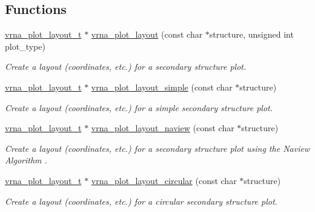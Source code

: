 \subsection*{Functions}
\begin{DoxyCompactItemize}
\item 
\mbox{\hyperlink{group__plot__layout__utils_gac986fe092abc2a6a93ceb5141e4dd28b}{vrna\+\_\+plot\+\_\+layout\+\_\+t}} $\ast$ \mbox{\hyperlink{group__plot__layout__utils_ga7953b759eada86c61b0a4aebe0dc67d1}{vrna\+\_\+plot\+\_\+layout}} (const char $\ast$structure, unsigned int plot\+\_\+type)
\begin{DoxyCompactList}\small\item\em Create a layout (coordinates, etc.) for a secondary structure plot. \end{DoxyCompactList}\item 
\mbox{\hyperlink{group__plot__layout__utils_gac986fe092abc2a6a93ceb5141e4dd28b}{vrna\+\_\+plot\+\_\+layout\+\_\+t}} $\ast$ \mbox{\hyperlink{group__plot__layout__utils_ga8b09019a429c7c2447be94901c7ed658}{vrna\+\_\+plot\+\_\+layout\+\_\+simple}} (const char $\ast$structure)
\begin{DoxyCompactList}\small\item\em Create a layout (coordinates, etc.) for a {\itshape simple} secondary structure plot. \end{DoxyCompactList}\item 
\mbox{\hyperlink{group__plot__layout__utils_gac986fe092abc2a6a93ceb5141e4dd28b}{vrna\+\_\+plot\+\_\+layout\+\_\+t}} $\ast$ \mbox{\hyperlink{group__plot__layout__utils_gab0e886afe200db9323e4e65d44738177}{vrna\+\_\+plot\+\_\+layout\+\_\+naview}} (const char $\ast$structure)
\begin{DoxyCompactList}\small\item\em Create a layout (coordinates, etc.) for a secondary structure plot using the {\itshape Naview Algorithm} \cite{bruccoleri:1988}. \end{DoxyCompactList}\item 
\mbox{\hyperlink{group__plot__layout__utils_gac986fe092abc2a6a93ceb5141e4dd28b}{vrna\+\_\+plot\+\_\+layout\+\_\+t}} $\ast$ \mbox{\hyperlink{group__plot__layout__utils_ga41d94adbd42e1a570d840756e6dd6909}{vrna\+\_\+plot\+\_\+layout\+\_\+circular}} (const char $\ast$structure)
\begin{DoxyCompactList}\small\item\em Create a layout (coordinates, etc.) for a {\itshape circular} secondary structure plot. \end{DoxyCompactList}\item 

\end{DoxyCompactItemize}
